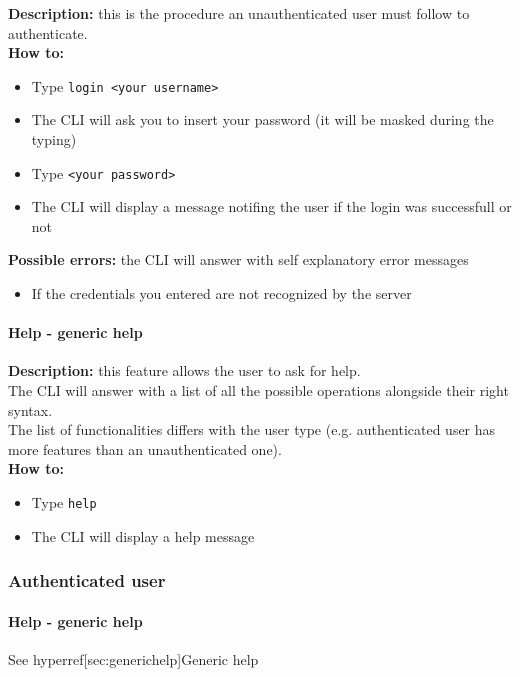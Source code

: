 \documentclass{scalatekids-article}
\begin{document}
\textbf{Description:} this is the procedure an unauthenticated user must follow to authenticate.\\
\textbf{How to:}
\begin{itemize}
\item Type \texttt{login <your username>}
\item The CLI will ask you to insert your password (it will be masked during the typing)
\item Type \texttt{<your password>}
\item The CLI will display a message notifing the user if the login was successfull or not
\end{itemize}
\textbf{Possible errors:} the CLI will answer with self explanatory error messages
\begin{itemize}
\item If the credentials you entered are not recognized by the server
\end{itemize}

\paragraph{Help - generic help}
\label{sec:generichelp}
\textbf{Description:} this feature allows the user to ask for help.\\
The CLI will answer with a list of all the possible operations alongside
their right syntax.\\
The list of functionalities differs with the user type (e.g. authenticated user has more features than an unauthenticated one).\\
\textbf{How to:}
\begin{itemize}
\item Type \texttt{help}
\item The CLI will display a help message
\end{itemize}

\subsubsection{Authenticated user}
\label{sec:authenticateduser}

\paragraph{Help - generic help}

See hyperref[sec:generichelp]{Generic help}
\end{document}
